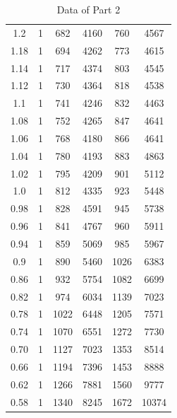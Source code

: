 \documentclass[11pt,a4paper,notitlepage]{scrartcl}
\begin{document}
\begin{table}[H]
\begin{tabular}{c|c|c|c|c|c}
		1.2  & 1      & 682         & 4160  & 760         & 4567  \\
		1.18 & 1      & 694         & 4262  & 773         & 4615  \\
		1.14 & 1      & 717         & 4374  & 803         & 4545  \\
		1.12 & 1      & 730         & 4364  & 818         & 4538  \\
		1.1  & 1      & 741         & 4246  & 832         & 4463  \\
		1.08 & 1      & 752         & 4265  & 847         & 4641  \\
		1.06 & 1      & 768         & 4180  & 866         & 4641  \\
		1.04 & 1      & 780         & 4193  & 883         & 4863  \\
		1.02 & 1      & 795         & 4209  & 901         & 5112  \\
		1.0  & 1      & 812         & 4335  & 923         & 5448  \\
		0.98 & 1      & 828         & 4591  & 945         & 5738  \\
		0.96 & 1      & 841         & 4767  & 960         & 5911  \\
		0.94 & 1      & 859         & 5069  & 985         & 5967  \\
		0.9  & 1      & 890         & 5460  & 1026        & 6383  \\
		0.86 & 1      & 932         & 5754  & 1082        & 6699  \\
		0.82 & 1      & 974         & 6034  & 1139        & 7023  \\
		0.78 & 1      & 1022        & 6448  & 1205        & 7571  \\
		0.74 & 1      & 1070        & 6551  & 1272        & 7730  \\
		0.70 & 1      & 1127        & 7023  & 1353        & 8514  \\
		0.66 & 1      & 1194        & 7396  & 1453        & 8888  \\
		0.62 & 1      & 1266        & 7881  & 1560        & 9777  \\
		0.58 & 1      & 1340        & 8245  & 1672        & 10374 \\
	\end{tabular}
	\caption{Data of Part 2}
\end{table}
\end{document}
